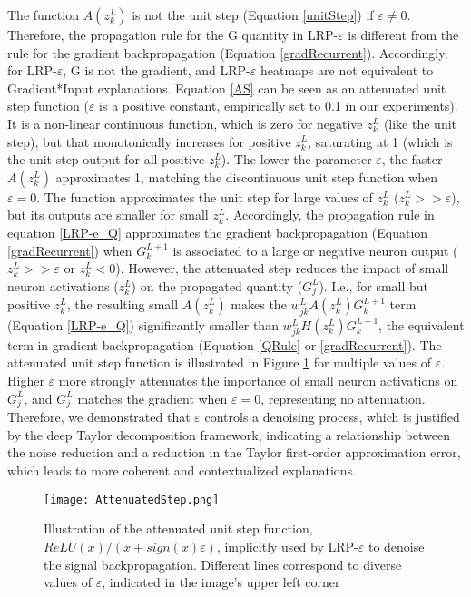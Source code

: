 \documentclass[fleqn,10pt]{wlscirep}
\begin{document}
{The function $A(z_{k}^{L})$ is not the unit step (Equation \ref{unitStep}) if $\varepsilon \neq 0$. Therefore, the propagation rule for the G quantity in LRP-$\varepsilon$ is different from the rule for the gradient backpropagation (Equation \ref{gradRecurrent}). Accordingly, for LRP-$\varepsilon$, G is not the gradient, and LRP-$\varepsilon$ heatmaps are not equivalent to Gradient*Input explanations. Equation \ref{AS} can be seen as an attenuated unit step function ($\varepsilon$ is a positive constant, empirically set to 0.1 in our experiments). It is a non-linear continuous function, which is zero for negative $z_{k}^{L}$ (like the unit step), but that monotonically increases for positive $z_{k}^{L}$, saturating at 1 (which is the unit step output for all positive $z_{k}^{L}$). The lower the parameter $\varepsilon$, the faster $A(z_{k}^{L})$ approximates 1, matching the discontinuous unit step function when $\varepsilon=0$. The function approximates the unit step for large values of $z_{k}^{L}$ ($z_{k}^{L}>>\varepsilon$), but its outputs are smaller for small $z_{k}^{L}$. Accordingly, the propagation rule in equation \ref{LRP-e_Q} approximates the gradient backpropagation (Equation \ref{gradRecurrent}) when $G_{k}^{L+1}$ is associated to a large or negative neuron output ($z_{k}^{L}>>\varepsilon$ or $z_{k}^{L}<0$). However, the attenuated step reduces the impact of small neuron activations ($z_{k}^{L}$) on the propagated quantity ($G_{j}^{L}$). I.e., for small but positive $z_{k}^{L}$, the resulting small $A(z_{k}^{L})$ makes the $w_{jk}^{L}A(z_{k}^{L})G_{k}^{L+1}$ term (Equation \ref{LRP-e_Q}) significantly smaller than $w_{jk}^{L}H(z_{k}^{L})G_{k}^{L+1}$, the equivalent term in gradient backpropagation (Equation \ref{QRule} or \ref{gradRecurrent}). The attenuated unit step function is illustrated in Figure \ref{atStep} for multiple values of $\varepsilon$. Higher $\varepsilon$ more strongly attenuates the importance of small neuron activations on $G_{j}^{L}$, and $G_{j}^{L}$ matches the gradient when $\varepsilon=0$, representing no attenuation. Therefore, we demonstrated that $\varepsilon$ controls a denoising process, which is justified by the deep Taylor decomposition framework, indicating a relationship between the noise reduction and a reduction in the Taylor first-order approximation error, which leads to more coherent and contextualized explanations\cite{LRPBook}.

\begin{figure}[!h]
\texttt{[image: AttenuatedStep.png]}
\centering
\caption{Illustration of the attenuated unit step function, $ReLU(x)/(x+sign(x)\varepsilon)$, implicitly used by LRP-$\varepsilon$ to denoise the signal backpropagation. Different lines correspond to diverse values of $\varepsilon$, indicated in the image's upper left corner}
\label{atStep}
\end{figure}

}
\end{document}
